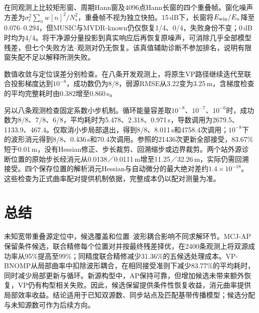 \documentclass[a4paper,fleqn]{cas-sc}
\begin{document}
在同观测上比较矩形窗、周期Hann窗及4096点Hann长窗的四个重叠帧。窗化噪声方差为$\sigma_t^2\sum_n w[n]^2/N_s^2$，重叠帧不视为独立快拍。15\,dB下，长窗将$E_{\rm win}/E_n$降至0.076--0.294，但MUSIC与MVDR-known仍仅恢复1/4、0/4，失败身份不变；0\,dB时均为4/4。将干净源分量投影到真实响应后再恢复原噪声，可消除几乎全部模型残差，但七个失败方法--观测对仍无恢复。该真值辅助诊断不参加排名，说明有限窗失配不足以解释所测失败。

\label{en:localchecks}
数值收敛与定位误差分别检查。在八条开发观测上，将原生VP路径继续迭代至联合投影梯度达到$10^{-8}$，成功数仍为8/8，弱源RMSE从3.22变为3.25\,m，含梯度检查的平均完整耗时由0.382增至0.860\,s。

另以八条观测检查固定系数小步机制。循环能量容差取$10^{-8}$、$10^{-7}$、$10^{-6}$时，成功数为8/8、7/8、6/8，平均耗时为5.478、2.318、0.971\,s，导数调用为2679.5、1133.9、467.4。仅取消小步局部退出，得到8/8、8.011\,s和4758.4次调用；$10^{-8}$下的波形消元得到8/8、0.436\,s和70.4次调用。参照的21436次更新全部接受，83.67\%短于0.01\,m，没有Hessian修正、步长裁剪、回溯缩步或边界裁剪。两个站外源诊断位置的原始步长经消元从0.0138／0.0111\,m增至11.25／32.26\,m，实际仍需回溯接受。四个保存位置的解析消元Hessian与自动微分的最大绝对差约$1.4\times10^{-18}$。这些检查为正式曲率配对提供机制依据，完整成本仍以配对测量为准。

\FloatBarrier
\section{总结}
未知宽带重叠源定位中，候选覆盖和位置--波形耦合影响不同求解环节。MCJ-AP保留条件候选，联合精修每个位置对并按最终残差择优，在2400条观测上将双源成功率从95\%提高至99\%；同精度联合精修减少31.36\%的五候选处理成本。VP-BNOMP从局部曲率中扣除波形耦合，在相同接受准则下减少83.77\%的平均耗时，同时减少局部更新与循环。新源构型中，AP保持可靠，但增加候选未带来额外恢复，VP仍有构型相关失败。因此，候选保留提供条件性恢复收益，消元曲率提供局部效率收益。结论适用于已知双源数、同步站点及匹配基带传播模型；候选分配与未知源数可作为后续方向。

\FloatBarrier
\appendix
\FloatBarrier
\end{document}
